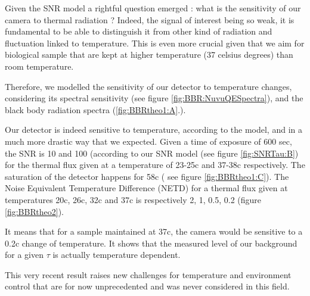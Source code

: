Given the SNR model a rightful question emerged : what is the sensitivity of our camera to thermal radiation ? Indeed, the signal of interest being so weak, it is fundamental to be able to distinguish it from other kind of radiation and fluctuation linked to temperature. This is even more crucial given that we aim for biological sample that are kept at higher temperature (37 celsius degrees) than room temperature.\par

Therefore, we modelled the sensitivity of our detector to temperature changes, considering its spectral sensitivity (see figure \ref{fig:BBR:NuvuQESpectra}), and the black body radiation spectra (\ref{fig:BBRtheo1:A}.). \par
Our detector is indeed sensitive to temperature, according to the model, and in a much more drastic way that we expected.  Given a time of exposure of 600 sec, the SNR is 10 and 100 (according to our SNR model (see figure \ref{fig:SNRTau:B}) for the thermal flux given at a temperature of  23-25c and 37-38c respectively. The saturation of the detector happens for 58\°c ( see figure \ref{fig:BBRtheo1:C}). The Noise Equivalent Temperature Difference (NETD) for a thermal flux given at temperatures 20c, 26c, 32c and 37c is respectively 2, 1, 0.5, 0.2 (figure \ref{fig:BBRtheo2}).\par
It means that for a sample maintained at 37c, the camera would be sensitive to  a 0.2c change of temperature. It shows that the measured level of our background for a given $\tau$ is actually temperature dependent.  \par
This very recent result raises new challenges for temperature and environment control that are for now unprecedented and was never considered in this field.\par

%	


